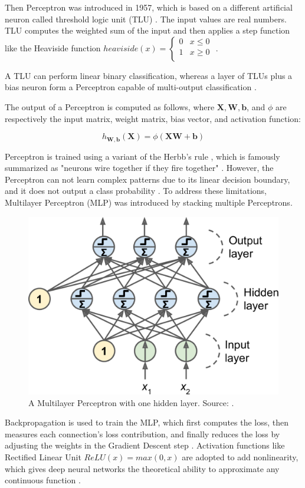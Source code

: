 \documentclass[a4paper, 11pt, oneside]{article}
\begin{document}
Then Perceptron was introduced in 1957, which is based on a different artificial neuron called threshold logic unit
(TLU) \cite{rosenblatt1957perceptron}. The input values are real numbers. TLU computes the weighted sum of the input
and then applies a step function like the Heaviside function
$heaviside (x) =
\begin{cases}
  0 & x \le 0 \\
  1 & x \geq 0 \\
\end{cases}$
\cite{geron2019hands, rosenblatt1957perceptron}.

A TLU can perform linear binary classification, whereas a layer of TLUs plus a bias neuron form a Perceptron capable of
multi-output classification \cite{geron2019hands}.

The output of a Perceptron is computed as follows, where $\mathbf{X}, \mathbf{W}, \mathbf{b}$, and $\phi$
are respectively the input matrix, weight matrix, bias vector, and activation function:

$$h_{\mathbf{W,b}}(\mathbf{X}) = \phi(\mathbf{XW} + \mathbf{b})$$

Perceptron is trained using a variant of the Herbb's rule \cite{hebb2005organization}, which is famously summarized
as "neurons wire together if they fire together" \cite{lowel1992selection}. However, the Perceptron
can not learn complex patterns due to its linear decision boundary, and it does not output a class probability
\cite{geron2019hands}. To address these limitations, Multilayer Perceptron (MLP) was introduced by stacking multiple
Perceptrons.

\begin{figure}[ht]
  \begin{center}
    \includegraphics[width=.5\textwidth]{mlp.png}
  \end{center}
  \caption{A Multilayer Perceptron with one hidden layer. Source: \cite{geron2019hands}.}
\end{figure}

Backpropagation \cite{rumelhart1985learning} is used to train the MLP, which first computes the loss, then measures each
connection's loss contribution, and finally reduces the loss by adjusting the weights in the Gradient Descent
\cite{ruder2016overview} step \cite{geron2019hands}. Activation functions like Rectified Linear Unit
$ReLU(x) = max(0, x)$ are adopted to add nonlinearity, which gives deep neural networks the theoretical
ability to approximate any continuous function \cite{geron2019hands}.
\end{document}
